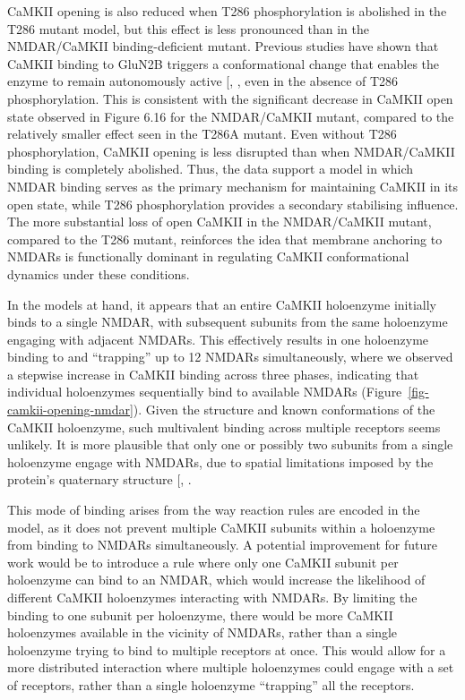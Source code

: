 \documentclass[
  11pt,
  letterpaper,
]{scrreprt}
\begin{document}
CaMKII opening is also reduced when T286 phosphorylation is abolished in
the T286 mutant model, but this effect is less pronounced than in the
NMDAR/CaMKII binding-deficient mutant. Previous studies have shown that
CaMKII binding to GluN2B triggers a conformational change that enables
the enzyme to remain autonomously active
{[},
\citeproc{ref-barcomb2016CaMKIIa}{453}{]}, even in the absence of T286
phosphorylation. This is consistent with the significant decrease in
CaMKII open state observed in Figure 6.16 for the NMDAR/CaMKII mutant,
compared to the relatively smaller effect seen in the T286A mutant. Even
without T286 phosphorylation, CaMKII opening is less disrupted than when
NMDAR/CaMKII binding is completely abolished. Thus, the data support a
model in which NMDAR binding serves as the primary mechanism for
maintaining CaMKII in its open state, while T286 phosphorylation
provides a secondary stabilising influence. The more substantial loss of
open CaMKII in the NMDAR/CaMKII mutant, compared to the T286 mutant,
reinforces the idea that membrane anchoring to NMDARs is functionally
dominant in regulating CaMKII conformational dynamics under these
conditions.

In the models at hand, it appears that an entire CaMKII holoenzyme
initially binds to a single NMDAR, with subsequent subunits from the
same holoenzyme engaging with adjacent NMDARs. This effectively results
in one holoenzyme binding to and ``trapping'' up to 12 NMDARs
simultaneously, where we observed a stepwise increase in CaMKII binding
across three phases, indicating that individual holoenzymes sequentially
bind to available NMDARs (Figure~\ref{fig-camkii-opening-nmdar}). Given
the structure and known conformations of the CaMKII holoenzyme, such
multivalent binding across multiple receptors seems unlikely. It is more
plausible that only one or possibly two subunits from a single
holoenzyme engage with NMDARs, due to spatial limitations imposed by the
protein's quaternary structure
{[},
\citeproc{ref-ozden2022CaMKII}{169}{]}.

This mode of binding arises from the way reaction rules are encoded in
the model, as it does not prevent multiple CaMKII subunits within a
holoenzyme from binding to NMDARs simultaneously. A potential
improvement for future work would be to introduce a rule where only one
CaMKII subunit per holoenzyme can bind to an NMDAR, which would increase
the likelihood of different CaMKII holoenzymes interacting with NMDARs.
By limiting the binding to one subunit per holoenzyme, there would be
more CaMKII holoenzymes available in the vicinity of NMDARs, rather than
a single holoenzyme trying to bind to multiple receptors at once. This
would allow for a more distributed interaction where multiple
holoenzymes could engage with a set of receptors, rather than a single
holoenzyme ``trapping'' all the receptors.
\end{document}
